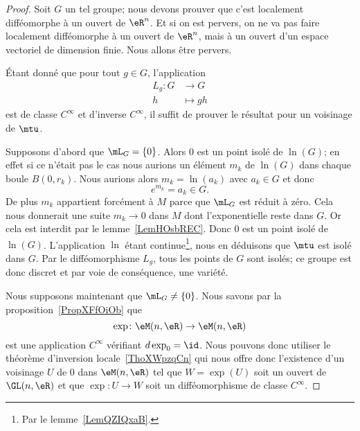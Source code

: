 \begin{proof}
    Soit \( G\) un tel groupe; nous devons prouver que c'est localement difféomorphe à un ouvert de \( \eR^n\). Et si on est pervers, on ne va pas faire localement difféomorphe à un ouvert de \( \eR^n\), mais à un ouvert d'un espace vectoriel de dimension finie. Nous allons être pervers.

    Étant donné que pour tout \( g\in G\), l'application
    \begin{equation}
        \begin{aligned}
            L_g\colon G & \to G \\
                      h &\mapsto gh
        \end{aligned}
    \end{equation}
    est de classe \(  C^{\infty}\) et d'inverse \(  C^{\infty}\), il suffit de prouver le résultat pour un voisinage de \( \mtu\).

    Supposons d'abord que \( \mL_G=\{ 0 \}\). Alors \( 0\) est un point isolé de \( \ln(G)\); en effet si ce n'était pas le cas nous aurions un élément \( m_k\) de \( \ln(G)\) dans chaque boule \( B(0,r_k)\). Nous aurions alors \( m_k=\ln(a_k)\) avec \( a_k\in G\) et donc
    \begin{equation}
        e^{m_k}=a_k\in G.
    \end{equation}
    De plus \( m_k\) appartient forcément à \( M\) parce que \( \mL_G\) est réduit à zéro. Cela nous donnerait une suite \( m_k\to 0\) dans \( M\) dont l'exponentielle reste dans \( G\). Or cela est interdit par le lemme~\ref{LemHOsbREC}. Donc \( 0\) est un point isolé de \( \ln(G)\). L'application \(\ln\) étant continue\footnote{Par le lemme~\ref{LemQZIQxaB}.}, nous en déduisons que \( \mtu\) est isolé dans \( G\). Par le difféomorphisme \( L_g\), tous les points de \( G\) sont isolés; ce groupe est donc discret et par voie de conséquence, une variété.

    Nous supposons maintenant que \( \mL_G\neq\{ 0 \}\). Nous savons par la proposition~\ref{PropXFfOiOb} que
    \begin{equation}
        \exp\colon \eM(n,\eR)\to \eM(n,\eR)
    \end{equation}
    est une application \(  C^{\infty}\) vérifiant \( d\exp_0=\id\). Nous pouvons donc utiliser le théorème d'inversion locale~\ref{ThoXWpzqCn} qui nous offre donc l'existence d'un voisinage \( U\) de \( 0\) dans \( \eM(n,\eR)\) tel que \( W=\exp(U)\) soit un ouvert de \( \GL(n,\eR)\) et que \( \exp\colon U\to W\) soit un difféomorphisme de classe \(  C^{\infty}\).


\end{proof}
